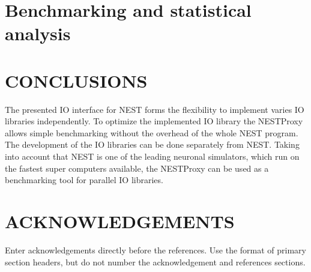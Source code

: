 \documentclass[]{YIC2015}
\begin{document}
\section{Benchmarking and statistical analysis}


\section{CONCLUSIONS}
The presented IO interface for NEST forms the flexibility to implement varies IO libraries independently.
To optimize the implemented IO library the NESTProxy allows simple benchmarking without the overhead of the whole NEST program.
The development of the IO libraries can be done separately from NEST.
Taking into account that NEST is one of the leading neuronal simulators, which run on the fastest super computers available,
the NESTProxy can be used as a benchmarking tool for parallel IO libraries.

\section*{ACKNOWLEDGEMENTS}
Enter acknowledgements directly before the references. Use the format of primary section headers, but do not number the acknowledgement and references sections.
\end{document}

